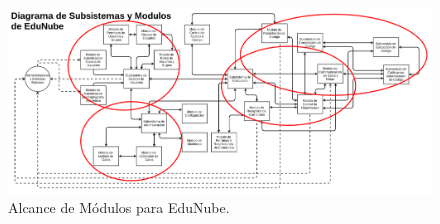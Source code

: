 \begin{landscape}

	\begin{figure}
	  \begin{center}
	    \includegraphics[width=1.7\textwidth]{Figures/alc_mod_en.png}
	  \end{center}
	  \caption{Alcance de Módulos para EduNube.}
	  \label{alc_mod_en}
	\end{figure}

\end{landscape}


